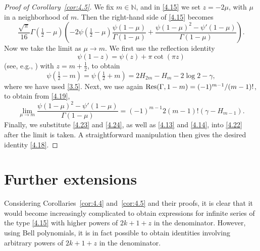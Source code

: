 \documentclass{amsart}
\theoremstyle{definition}
\theoremstyle{remark}
\numberwithin{equation}{section}
\begin{document}
\begin{proof}[Proof of Corollary~\ref{cor:4.5}]
We fix $m\in{\mathbb{N}}$, and in \eqref{4.15} we set $z=-2\mu$, with $\mu$ in
a neighborhood of $m$. Then the right-hand side of \eqref{4.15} becomes
\begin{equation}\label{4.22}
\frac{\sqrt{\pi}}{16}\Gamma(\tfrac{1}{2}-\mu)\left(-2\psi(\tfrac{1}{2}-\mu)
\frac{\psi(1-\mu)}{\Gamma(1-\mu)}
+\frac{\psi(1-\mu)^2-\psi'(1-\mu)}{\Gamma(1-\mu)}\right).
\end{equation}
Now we take the limit as $\mu\to m$. We first use the reflection identity
\[
\psi(1-z) = \psi(z)+\pi\cot(\pi z)
\]
(see, e.g., \cite[eq.~(5.5.4)]{DLMF}) with $z=m+\frac{1}{2}$, to obtain 
\begin{equation}\label{4.23}
\psi(\tfrac{1}{2}-m)=\psi(\tfrac{1}{2}+m) = 2H_{2m}-H_m-2\log{2}-\gamma,
\end{equation}
where we have used \eqref{3.5}. Next, we use again 
${\rm Res}(\Gamma, 1-m)=(-1)^{m-1}/(m-1)!$, to obtain from \eqref{4.19},
\begin{equation}\label{4.24}
\lim_{\mu\to m}\frac{\psi(1-\mu)^2-\psi'(1-\mu)}{\Gamma(1-\mu)}
= (-1)^{m-1}2(m-1)!\left(\gamma-H_{m-1}\right).
\end{equation}
Finally, we substitute \eqref{4.23} and \eqref{4.24}, as well as \eqref{4.13}
and \eqref{4.14}, into \eqref{4.22} after the limit is taken. A straightforward
manipulation then gives the desired identity \eqref{4.18}.
\end{proof}


\section{Further extensions}\label{sec:5}

Considering Corollaries~\ref{cor:4.4} and~\ref{cor:4.5} and their proofs, it is
clear that it would become increasingly complicated to obtain expressions for
infinite series of the type \eqref{4.15} with higher powers of $2k+1+z$ in the
denominator. However, using Bell polynomials, it is in fact
possible to obtain identities involving arbitrary powers of $2k+1+z$ in the
denominator. 
\end{document}
